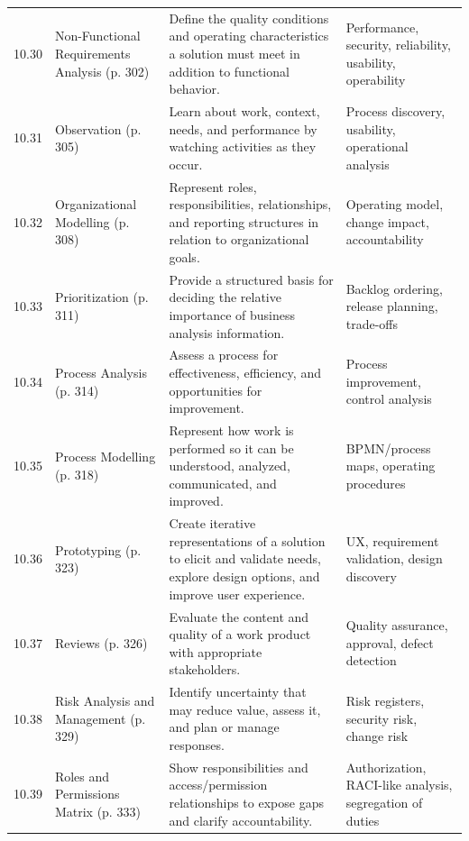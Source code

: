 \documentclass[11pt]{article}
\begin{document}
\begin{longtable}{@{}L{0.06\textwidth} L{0.24\textwidth} L{0.43\textwidth} L{0.18\textwidth}@{}}
10.30 & Non-Functional Requirements Analysis \textcolor{BASlate}{\scriptsize (p. 302)} & Define the quality conditions and operating characteristics a solution must meet in addition to functional behavior. & Performance, security, reliability, usability, operability\\
10.31 & Observation \textcolor{BASlate}{\scriptsize (p. 305)} & Learn about work, context, needs, and performance by watching activities as they occur. & Process discovery, usability, operational analysis\\
10.32 & Organizational Modelling \textcolor{BASlate}{\scriptsize (p. 308)} & Represent roles, responsibilities, relationships, and reporting structures in relation to organizational goals. & Operating model, change impact, accountability\\
10.33 & Prioritization \textcolor{BASlate}{\scriptsize (p. 311)} & Provide a structured basis for deciding the relative importance of business analysis information. & Backlog ordering, release planning, trade-offs\\
10.34 & Process Analysis \textcolor{BASlate}{\scriptsize (p. 314)} & Assess a process for effectiveness, efficiency, and opportunities for improvement. & Process improvement, control analysis\\
10.35 & Process Modelling \textcolor{BASlate}{\scriptsize (p. 318)} & Represent how work is performed so it can be understood, analyzed, communicated, and improved. & BPMN/process maps, operating procedures\\
10.36 & Prototyping \textcolor{BASlate}{\scriptsize (p. 323)} & Create iterative representations of a solution to elicit and validate needs, explore design options, and improve user experience. & UX, requirement validation, design discovery\\
10.37 & Reviews \textcolor{BASlate}{\scriptsize (p. 326)} & Evaluate the content and quality of a work product with appropriate stakeholders. & Quality assurance, approval, defect detection\\
10.38 & Risk Analysis and Management \textcolor{BASlate}{\scriptsize (p. 329)} & Identify uncertainty that may reduce value, assess it, and plan or manage responses. & Risk registers, security risk, change risk\\
10.39 & Roles and Permissions Matrix \textcolor{BASlate}{\scriptsize (p. 333)} & Show responsibilities and access/permission relationships to expose gaps and clarify accountability. & Authorization, RACI-like analysis, segregation of duties\\

\end{longtable}
\end{document}
